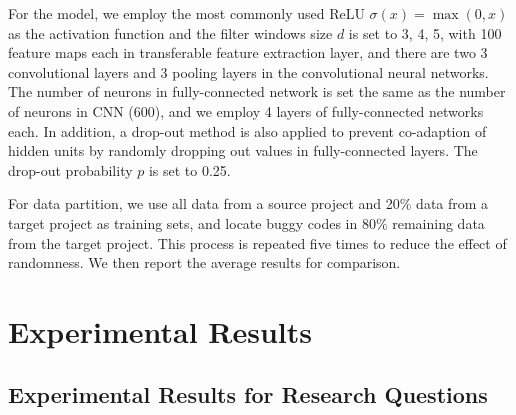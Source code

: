 For the \TRANPCNN model, we employ the most commonly used ReLU $\sigma(x)=\max(0,x)$ as the activation function and the filter windows size $d$ is set to 3, 4, 5, with 100 feature maps each in transferable feature extraction layer, and there are two 3 convolutional layers and 3 pooling layers in the convolutional neural networks. The number of neurons in fully-connected network is set the same as the number of neurons in CNN (600), and we employ 4 layers of fully-connected networks each. In addition, a drop-out method is also applied to prevent co-adaption of hidden units by randomly dropping out values in fully-connected layers. The drop-out probability $p$ is set to 0.25.

For data partition, we use all data from a source project and 20\% data from a target project as training sets, and locate buggy codes in 80\% remaining data from the target project. This process is repeated five times to reduce the effect of randomness. We then report the average results for comparison. 

\section{Experimental Results}

\subsection{Experimental Results for Research Questions}

